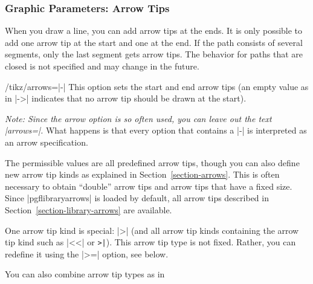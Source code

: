 \subsubsection{Graphic Parameters: Arrow Tips}

When you draw a line, you can add arrow tips at the ends. It is
only possible to add one arrow tip at the start and one at the end. If
the path consists of several segments, only the last segment gets
arrow tips. The behavior for paths that are closed is not specified
and may change in the future.

\begin{key}{/tikz/arrows=|-|}
  This option sets the start and end arrow tips (an empty value as in |->|
  indicates that no arrow tip should be drawn at the start).%

  \emph{Note: Since the arrow option is so often used, you can leave
    out the text |arrows=|.} What happens is that every option that
  contains a |-| is interpreted as an arrow specification.

\begin{codeexample}[]
\end{codeexample}

  The permissible values are all predefined arrow tips, though
  you can also define new arrow tip kinds as explained in
  Section~\ref{section-arrows}. This is often necessary to obtain
  ``double'' arrow tips and arrow tips that have a fixed size. Since
  |pgflibraryarrows| is loaded by default, all arrow tips described in
  Section~\ref{section-library-arrows} are available.

  One arrow tip kind is special: |>| (and all arrow tip kinds containing the
  arrow tip kind such as |<<| or \verb!>|!). This arrow tip type is not  
  fixed. Rather, you can redefine it using the |>=| option, see
  below. 

  \example You can also combine arrow tip types as in
\begin{codeexample}[]
\begin{tikzpicture}[thick]
  \draw[to reversed-to]   (0,0) .. controls +(.5,0) and +(-.5,-.5) .. +(1.5,1);
  \draw[[-latex reversed] (1,0) .. controls +(.5,0) and +(-.5,-.5) .. +(1.5,1);
  \draw[latex-)]          (2,0) .. controls +(.5,0) and +(-.5,-.5) .. +(1.5,1);
  \useasboundingbox (-.1,-.1) rectangle (3.1,1.1); %
\end{tikzpicture}
\end{codeexample}
\end{key}

